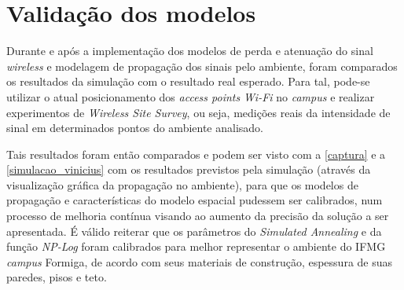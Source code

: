 \documentclass[
	12pt,				%
	twoside,			%
	a4paper,			%
	english,			%
	french,				%
	spanish,			%
	brazil				%
	]{abntex2}
\begin{document}
\section{Validação dos modelos}\label{validauxe7uxe3o-dos-modelos}

Durante e após a implementação dos modelos de perda e atenuação do sinal
\emph{wireless} e modelagem de propagação dos sinais pelo ambiente,
foram comparados os resultados da simulação com o resultado real
esperado. Para tal, pode-se utilizar o atual posicionamento dos
\emph{access points} \emph{Wi-Fi} no \emph{campus} e realizar
experimentos de \emph{Wireless Site Survey}, ou seja, medições reais da
intensidade de sinal em determinados pontos do ambiente analisado.

Tais resultados foram então comparados e podem ser visto com a
\autoref{captura} e a \autoref{simulacao_vinicius} com os resultados
previstos pela simulação (através da visualização gráfica da propagação
no ambiente), para que os modelos de propagação e características do
modelo espacial pudessem ser calibrados, num processo de melhoria
contínua visando ao aumento da precisão da solução a ser apresentada. É
válido reiterar que os parâmetros do \emph{Simulated Annealing} e da
função \emph{NP-Log} foram calibrados para melhor representar o ambiente
do IFMG \emph{campus} Formiga, de acordo com seus materiais de
construção, espessura de suas paredes, pisos e teto.
\end{document}
